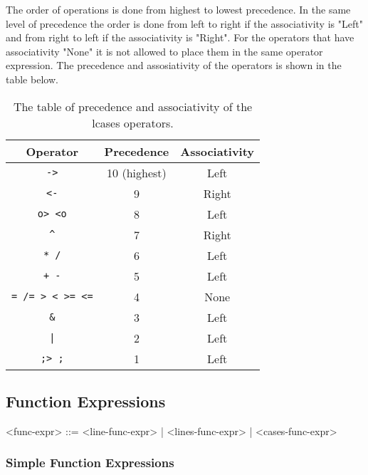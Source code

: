 \documentclass{article}
\begin{document}
The order of operations is done from highest to lowest precedence. In the same
level of precedence the order is done from left to right if the associativity
is "Left" and from right to left if the associativity is "Right". For the
operators that have associativity "None" it is not allowed to place them in the
same operator expression. The precedence and assosiativity of the operators
is shown in the table below.
\begin{table}[h!]

\caption{ The table of precedence and associativity of the lcases operators.  }

\begin{center}
\begin{tabular}{ |c|c|c| } 
\hline
Operator & Precedence & Associativity \\ 
\hline
\hline
\texttt{->} & 10 (highest) & Left \\
\hline
\texttt{<-} & 9 & Right \\
\hline
\texttt{o> <o} & 8 & Left \\
\hline
\texttt{\^} & 7 & Right \\
\hline
\texttt{* /} & 6 & Left \\
\hline
\texttt{+ -} & 5 & Left \\ 
\hline
\texttt{= /= > < >= <=} & 4 & None \\
\hline
\texttt{\&} & 3 & Left \\
\hline
\texttt{|} & 2 & Left \\
\hline
\texttt{;> ;} & 1 & Left \\
\hline
\end{tabular}
\end{center}

\label{table:precassoc}

\end{table}

\newpage
\subsection{Function Expressions}
\label{subsec:funcexprs}

\begin{grammar}
<func-expr> ::= <line-func-expr> | <lines-func-expr> | <cases-func-expr>
\end{grammar}
\subsubsection{Simple Function Expressions}
\end{document}
